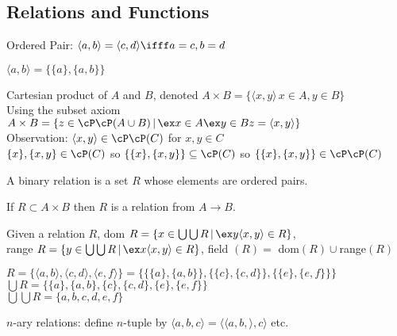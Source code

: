 
\subsection{Relations and Functions}

Ordered Pair: $\langle a,b \rangle = \langle c, d \rangle \ifff a=c, b=d$ 

\begin{definition}
    $\langle a,b \rangle = \{ \{a\}, \{a, b\} \}$ 
\end{definition}

\noindent
Cartesian product of $A$ and $B$, denoted $A \times B = \{ \langle x , y \rangle \, x \in A, y \in B\}$ \\
Using the subset axiom $A \times B = \{z \in \cP \cP (A \cup B) \, | \, \ex x \in A \ex y \in B z = \langle x , y \rangle\}$ \\
Observation: $\langle x , y \rangle \in \cP \cP (C) $ for $x, y \in C$ \\
$\{x\}, \{x, y\} \in \cP(C)$ so $\{ \{x\}, \{ x,y\}\} \subseteq \cP(C)$ so $\{ \{x\}, \{ x,y\}\} \in \cP \cP(C)$ 

\begin{definition}
    A binary relation is a set $R$ whose elements are ordered pairs. 
\end{definition}

\noindent
If $R \subset A \times B$ then $R$ is a relation from $A \to B$. 

\begin{definition}
    Given a relation $R$, dom $R = \{x \in \bigcup \bigcup R \, | \, \ex y \langle x , y \rangle \in R\}$,\\ range $R = \{y \in \bigcup \bigcup R \, | \, \ex x \langle x , y \rangle \in R \} $, field $(R) =$ dom$(R) \cup $range$(R)$
\end{definition}

\begin{example}
    $R = \{ \langle a , b \rangle, \langle c, d \rangle, \langle e, f \rangle \} = \{ \{ \{a\}, \{a, b\} \}, \{ \{c\}, \{c, d\} \}, \{ \{e\}, \{e, f\} \} \}$ \\
    $\bigcup R = \{\{a\}, \{a,b\}, \{c\}, \{c, d\}, \{e\}, \{e, f\}\}$ \\
    $\bigcup \bigcup R = \{a, b, c, d, e, f\}$
\end{example}

\noindent
$n$-ary relations: define $n$-tuple by $\langle a, b, c \rangle = \langle \langle a, b, \rangle , c \rangle$ etc. 

